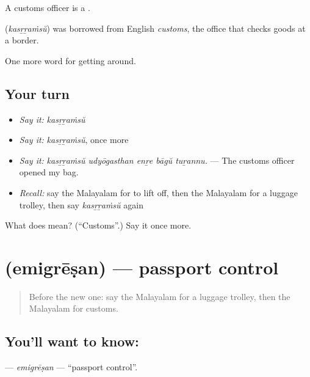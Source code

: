 A customs officer is a  .

\begin{cousinweb}
\textbf{} (\emph{kasṟṟaṁsŭ}) was borrowed from English \emph{customs}, the office that checks goods at a border.
\end{cousinweb}

\begin{grammarlens}[title={What you've built}]
One more word for getting around.
\end{grammarlens}

\subsection*{Your turn}
\begin{itemize}
\raggedright
  \item \emph{Say it:} \emph{kasṟṟaṁsŭ}
  \item \emph{Say it:} \emph{kasṟṟaṁsŭ}, once more
  \item \emph{Say it:} \emph{kasṟṟaṁsŭ udyōgasthan enṟe bāgŭ tuṟannu.} — The customs officer opened my bag.
  \item \emph{Recall:} say the Malayalam for to lift off, then the Malayalam for a luggage trolley, then say \emph{kasṟṟaṁsŭ} again
\end{itemize}

\begin{tcolorbox}[breakable,colback=teal!4,colframe=teal!35!black,title={Before you move on}]
What does  mean? (\textquotedblleft{}Customs\textquotedblright{}.) Say it once more.
\end{tcolorbox}
\section[\texorpdfstring{\ml{എമിഗ്രേഷൻ} (emigrēṣan)}{എമിഗ്രേഷൻ (emigrēṣan)}]{ (emigrēṣan) — passport control}

\label{lesson:ML-C464-emigresan}



\begin{quote}
Before the new one: say the Malayalam for a luggage trolley, then the Malayalam for customs.
\end{quote}

\subsection*{You'll want to know: }
\textbf{} — \emph{emigrēṣan} — \textquotedblleft{}passport control\textquotedblright{}.

